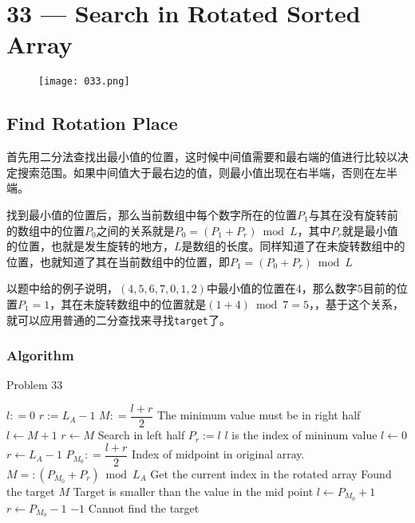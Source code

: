 \section{33 --- Search in Rotated Sorted Array}
\begin{figure}[H]
	\begin{center}
		\texttt{[image: 033.png]}
	\end{center}
\end{figure}
\subsection{Find Rotation Place}
\begin{CJK*}{UTF8}{gbsn}
首先用二分法查找出最小值的位置，这时候中间值需要和最右端的值进行比较以决定搜索范围。如果中间值大于最右边的值，则最小值出现在右半端，否则在左半端。
\par
找到最小值的位置后，那么当前数组中每个数字所在的位置$P_1$与其在没有旋转前的数组中的位置$P_0$之间的关系就是$P_0 = (P_1 + P_r) \bmod L$，其中$P_r$就是最小值的位置，也就是发生旋转的地方，$L$是数组的长度。同样知道了在未旋转数组中的位置，也就知道了其在当前数组中的位置，即$P_1 = (P_0+P_r) \bmod L$
\par
以题中给的例子说明，$(4,5,6,7,0,1,2)$中最小值的位置在4，那么数字5目前的位置$P_1=1$，其在未旋转数组中的位置就是$(1+4)\bmod 7 = 5$，，基于这个关系，就可以应用普通的二分查找来寻找\texttt{target}了。
\end{CJK*}
\subsubsection{Algorithm}
\setcounter{algorithm}{0}
\begin{algorithm}[H]
\caption{Problem 33}
\begin{algorithmic}[1]
\State $l : =0$
\State $r := L_A- 1$
\State $M: =\dfrac{l+r}{2}$ 
 \Comment The minimum value must be in right half
\State $l \gets M+1$
\Else
\State $r \gets M$ \Comment Search in left half
\EndIf
\EndWhile
\State $P_r := l$ \Comment $l$ is the index of mininum value
\State $l\gets 0$
\State $r \gets L_A-1$
\State $P_{M_0}: =\dfrac{l+r}{2}$  \Comment Index of midpoint in original array.
\State $M =: (P_{M_0}+P_r) \bmod L_A$ \Comment Get the current index in the rotated array
 \Comment Found the target
\State \Return $M$
\EndIf
{} \Comment Target is smaller than the value in the mid point
\State $l \gets P_{M_0}+1$
\Else
\State $r \gets P_{M_0}-1$
\EndIf
\EndWhile
\State \Return $-1$ \Comment Cannot find the target
\EndProcedure
\end{algorithmic}
\end{algorithm}